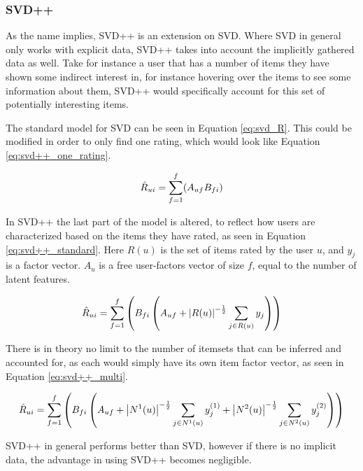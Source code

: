 \subsubsection{SVD++} \label{bg:mf_svd++}
As the name implies, SVD++ is an extension on SVD. Where SVD in general only works with explicit data, SVD++ takes into account the implicitly gathered data as well. Take for instance a user that has a number of items they have shown some indirect interest in, for instance hovering over the items to see some information about them, SVD++ would specifically account for this set of potentially interesting items\cite{svd++}.

The standard model for SVD can be seen in Equation \ref{eq:svd_R}. This could be modified in order to only find one rating, which would look like Equation \ref{eq:svd++_one_rating}.

\begin{equation} \label{eq:svd++_one_rating}
\centering
\hat{R}_{ui} = \sum^f_{f=1}(A_{uf}B_{fi})
\end{equation}

In SVD++ the last part of the model is altered, to reflect how users are characterized based on the items they have rated, as seen in Equation \ref{eq:svd++_standard}. Here $R(u)$ is the set of items rated by the user $u$, and $y_{j}$ is a factor vector. $A_{u}$ is a free user-factors vector of size $f$, equal to the number of latent features.

\begin{equation} \label{eq:svd++_standard}
\centering
\hat{R}_{ui} =\sum^f_{f=1}\left(B_{fi}\left (A_{uf} + \left | R(u) \right |^{-\frac{1}{2}} \sum_{j\in R(u)} y_{j} \right )\right)
\end{equation}

There is in theory no limit to the number of itemsets that can be inferred and accounted for, as each would simply have its own item factor vector, as seen in Equation \ref{eq:svd++_multi}.

\begin{equation} \label{eq:svd++_multi}
\centering
\hat{R}_{ui} = \sum^f_{f=1}\left( B_{fi}\left (A_{uf} + \left | N^{1}(u) \right |^{-\frac{1}{2}} \sum_{j\in N^{1}(u)} y_{j}^{(1)} + \left | N^{2}(u) \right |^{-\frac{1}{2}} \sum_{j\in N^{2}(u)} y_{j}^{(2)} \right )\right)
\end{equation}

SVD++ in general performs better than SVD, however if there is no implicit data, the advantage in using SVD++ becomes negligible.